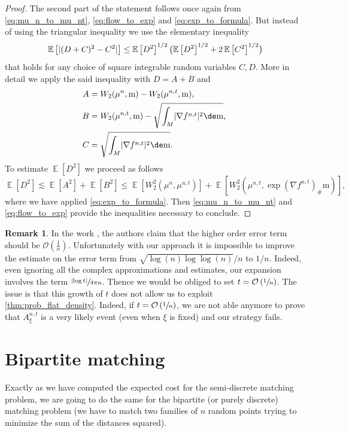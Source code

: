 \documentclass[JEP,XML,SOM,Unicode]{cedram}
\newcounter{results}[section]
\theoremstyle{plain}
\theoremstyle{definition}
\newtheorem{remark}[results]{Remark}
\numberwithin{equation}{section}
\newcommand{\E}[1]{\ensuremath{\operatorname{\mathbb{E}}\left[#1\right]}}
\newcommand{\bigo}{\ensuremath{\mathcal{O}}}
\renewcommand{\comma}{\ensuremath{\text{, }}}
\newcommand{\comma}{\ensuremath{\text{, }}}
\newcommand{\fullstop}{\ensuremath{\text{. }}}
\newcommand{\m}{\ensuremath{\mathrm m}}
\DeclarePairedDelimiter\abs{\lvert}{\rvert}
\begin{document}
\begin{proof}
The second part of the statement follows once again from \cref{eq:mu_n_to_mu_nt},
\cref{eq:flow_to_exp} and \cref{eq:exp_to_formula}.
But instead of using the triangular inequality we use the elementary inequality
\begin{equation*}
\E{\abs{(D+C)^2-C^2}} \le
\E{D^2}^{1/2}\bigl(\E{D^2}^{1/2}+2\E{C^2}^{1/2}\bigr)
\end{equation*}
that holds for any choice of square integrable random variables $C, D$.
More in detail we apply the said inequality with $D=A+B$ and
\begin{align*}
A &= W_2(\mu^n, \m) - W_2(\mu^{n,t}, \m) \comma\\
B &= W_2(\mu^{n,t}, \m) - \sqrt{\int_M\abs{\nabla f^{n,t}}^2\de\m} \comma\\
C &= \sqrt{\int_M\abs{\nabla f^{n,t}}^2\de\m} \fullstop
\end{align*}
To estimate $\E{D^2}$ we proceed as follows
\begin{equation*}
\E{D^2} \lesssim \E{A^2} + \E{B^2} \le \E{W_2^2(\mu^n, \mu^{n,t})} +
\E{W_2^2(\mu^{n,t}, \exp(\nabla f^{n,t})_\#\m)} \comma
\end{equation*}
where we have applied \cref{eq:exp_to_formula}. Then \cref{eq:mu_n_to_mu_nt} and \cref{eq:flow_to_exp} provide the inequalities necessary to conclude.
\end{proof}

\begin{remark}
In the work \cite{CaraccioloEtAl2014}, the authors claim that the higher order error term
should be $\bigo(\frac1n)$.
Unfortunately with our approach it is impossible to improve the estimate on the error term
from $\sqrt{\log(n)\log\log(n)}/n$ to $1/n$. Indeed, even ignoring all the complex approximations and
estimates, our expansion involves the term $\sfrac{\abs{\log t}}{4\pi n}$.
Thence we would be obliged to set $t = \bigo\left(\sfrac 1n\right)$.
The issue is that this growth of $t$ does not allow us to exploit \cref{thm:prob_flat_density}.
Indeed, if $t = \bigo\left(\sfrac 1n\right)$, we are not able anymore to prove that
$A^{n,t}_\xi$ is a very likely event (even when $\xi$ is fixed) and our strategy fails.
\end{remark}

\section{Bipartite matching}\label{sec:bipartite_matching}
Exactly as we have computed the expected cost for the semi-discrete matching problem, we are going to do
the same for the bipartite (or purely discrete) matching problem (\ie we have to match two families
of $n$ random points trying to minimize the sum of the distances squared).
\end{document}

